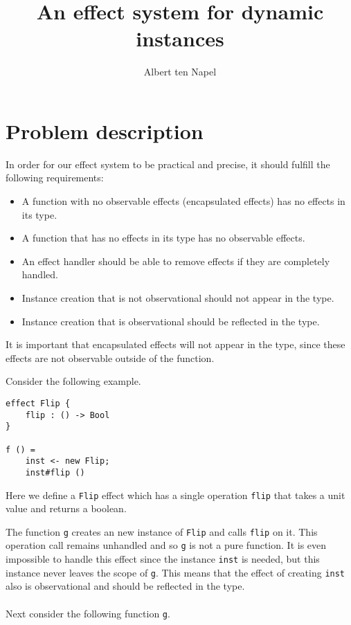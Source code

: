 \documentclass[12pt]{article}
\title{An effect system for dynamic instances}
\author{Albert ten Napel}
\date{}
\begin{document}
\maketitle

\section{Problem description}

In order for our effect system to be practical and precise, it should fulfill the following requirements:

\begin{itemize}
\item A function with no observable effects (encapsulated effects) has no effects in its type.
\item A function that has no effects in its type has no observable effects.
\item An effect handler should be able to remove effects if they are completely handled.
\item Instance creation that is not observational should not appear in the type.
\item Instance creation that is observational should be reflected in the type.
\end{itemize}

It is important that encapsulated effects will not appear in the type, since these effects are not observable outside of the function.


Consider the following example.

\begin{verbatim}
effect Flip {
	flip : () -> Bool
}

f () =
	inst <- new Flip;
	inst#flip ()
\end{verbatim}

Here we define a \texttt{Flip} effect which has a single operation \texttt{flip} that takes a unit value and returns a boolean.

The function \texttt{g} creates an new instance of \texttt{Flip} and calls \texttt{flip} on it.
This operation call remains unhandled and so \texttt{g} is not a pure function.
It is even impossible to handle this effect since the instance \texttt{inst} is needed, but this instance never leaves the scope of \texttt{g}. This means that the effect of creating \texttt{inst} also is observational and should be reflected in the type.
\\\\
Next consider the following function \texttt{g}.
\end{document}
